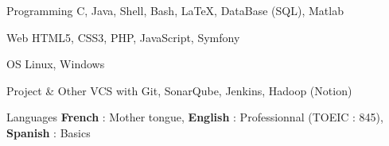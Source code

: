 

\begin{cvskills}

	\cvskill
		{Programming} %
		{C, Java, Shell, Bash, \LaTeX, DataBase (SQL), Matlab} %

	\cvskill
		{Web} %
		{HTML5, CSS3, PHP, JavaScript, Symfony} %

	\cvskill
		{OS} %
		{Linux, Windows} %
		
		\cvskill
		{Project \& Other} %
		{VCS with Git, SonarQube, Jenkins, Hadoop (Notion)} %

  \cvskill
    {Languages} %
    {\textbf{French} : Mother tongue, \textbf{English}  : Professionnal (TOEIC : 845), \textbf{Spanish} : Basics} %

\end{cvskills}
